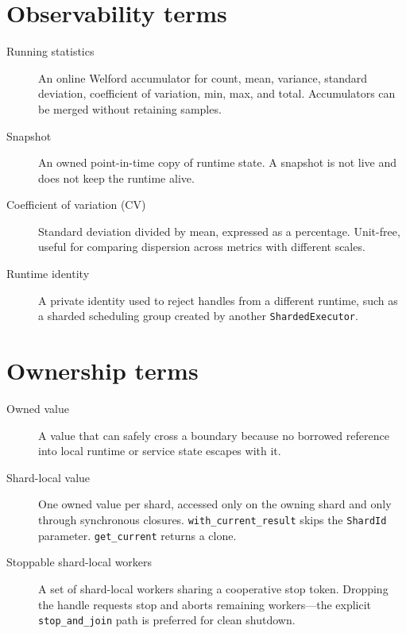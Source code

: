 \section{Observability terms}

\begin{description}
    \item[Running statistics] An online Welford accumulator for count, mean,
        variance, standard deviation, coefficient of variation, min, max, and
        total. Accumulators can be merged without retaining samples.

    \item[Snapshot] An owned point-in-time copy of runtime state. A snapshot is
        not live and does not keep the runtime alive.

    \item[Coefficient of variation (CV)] Standard deviation divided by mean,
        expressed as a percentage. Unit-free, useful for comparing dispersion
        across metrics with different scales.

    \item[Runtime identity] A private identity used to reject handles from a
        different runtime, such as a sharded scheduling group created by
        another \texttt{ShardedExecutor}.
\end{description}

\section{Ownership terms}

\begin{description}
    \item[Owned value] A value that can safely cross a boundary because no
        borrowed reference into local runtime or service state escapes with it.

    \item[Shard-local value] One owned value per shard, accessed only on the
        owning shard and only through synchronous closures.
        \texttt{with\_current\_result} skips the \texttt{ShardId} parameter.
        \texttt{get\_current} returns a clone.

    \item[Stoppable shard-local workers] A set of shard-local workers sharing
        a cooperative stop token. Dropping the handle requests stop and aborts
        remaining workers---the explicit \texttt{stop\_and\_join} path is
        preferred for clean shutdown.
\end{description}


